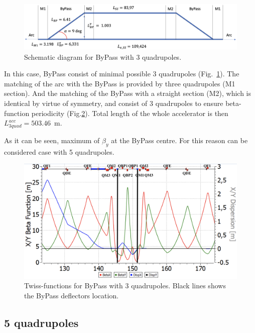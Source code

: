 \documentclass[a4paper]{jpconf}
\begin{document}
\begin{figure}[!h]
   \centering
   \includegraphics*[width=1.\columnwidth]{fig2}
   \caption{Schematic diagram for ByPass with 3 quadrupoles.}
   \label{fig:3quad}
\end{figure}

\par In this case, ByPass consist of minimal possible 3 quadrupoles (Fig.~\ref{fig:3quad}). The matching of the arc with the ByPass is provided by three quadrupoles (M1 section). And the matching of the ByPass with a straight section (M2), which is identical by virtue of symmetry, and consist of 3 quadrupoles to ensure beta-function periodicity (Fig.\ref{fig:3quadTwiss}). Total length of the whole accelerator is then $L^{acc}_{3quad} = 503.46$~m.

\par As it can be seen, maximum of $\beta_y$ at the ByPass centre.
For this reason can be considered case with 5 quadrupoles.

\begin{figure}[!h]
   \centering
   \includegraphics*[width=1.\columnwidth]{fig3}
   \caption{Twiss-functions for ByPass with 3 quadrupoles. Black lines shows the ByPass deflectors location.}
   \label{fig:3quadTwiss}
\end{figure}

\subsection{5 quadrupoles}
\end{document}
